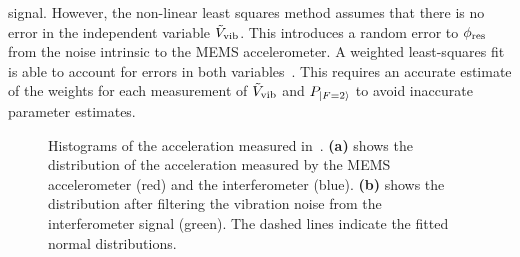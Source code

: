 signal. However, the non-linear least squares method assumes that
there is no error in the independent variable
$\tilde{V}_\textnormal{vib}$. This introduces a random
error to $\phi_\textnormal{res}$ from the noise intrinsic to the MEMS
accelerometer. A weighted least-squares fit is
able to account for errors in both variables~\cite{Macdonald1992}. This requires an
accurate estimate of the weights for each measurement of
$\tilde{V}_\textnormal{vib}$ and $P_{\ket{F=2}}$ to avoid inaccurate
parameter estimates.
\begin{figure}[htpb!]
  \centering
  \caption[Histogram of acceleration noise.]{Histograms of the
    acceleration measured in~. \textbf{(a)} shows
    the distribution of the acceleration measured by the MEMS
    accelerometer (red) and the interferometer (blue). \textbf{(b)} shows
    the distribution after filtering the vibration noise from the
    interferometer signal (green). The dashed lines indicate the
  fitted normal distributions.}
  \label{fig:vibration_hists}
\end{figure}

